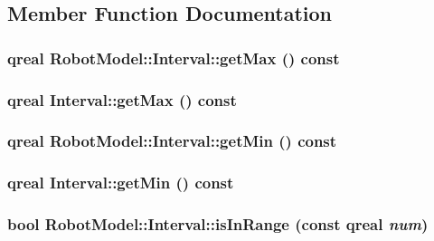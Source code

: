\subsection{Member Function Documentation}
\hypertarget{class_robot_model_1_1_interval_ab64bca0594297b837f9f53b8b5d26b45}{
\subsubsection[{getMax}]{\setlength{\rightskip}{0pt plus 5cm}qreal RobotModel::Interval::getMax () const}}
\label{class_robot_model_1_1_interval_ab64bca0594297b837f9f53b8b5d26b45}
\hypertarget{class_robot_model_1_1_interval_a26857944f58e736ed0abdf534e2f56d8}{
\subsubsection[{getMax}]{\setlength{\rightskip}{0pt plus 5cm}qreal Interval::getMax () const}}
\label{class_robot_model_1_1_interval_a26857944f58e736ed0abdf534e2f56d8}
\hypertarget{class_robot_model_1_1_interval_ac13db1c8d06222b4cc9247204e1e92f6}{
\subsubsection[{getMin}]{\setlength{\rightskip}{0pt plus 5cm}qreal RobotModel::Interval::getMin () const}}
\label{class_robot_model_1_1_interval_ac13db1c8d06222b4cc9247204e1e92f6}
\hypertarget{class_robot_model_1_1_interval_abb8aac06ae73b9dfc7c3caf3f8b56399}{
\subsubsection[{getMin}]{\setlength{\rightskip}{0pt plus 5cm}qreal Interval::getMin () const}}
\label{class_robot_model_1_1_interval_abb8aac06ae73b9dfc7c3caf3f8b56399}
\hypertarget{class_robot_model_1_1_interval_ae201eab3cef8bf4d1f9e7c0aa92c307b}{
\subsubsection[{isInRange}]{\setlength{\rightskip}{0pt plus 5cm}bool RobotModel::Interval::isInRange (const qreal {\em num})}}
